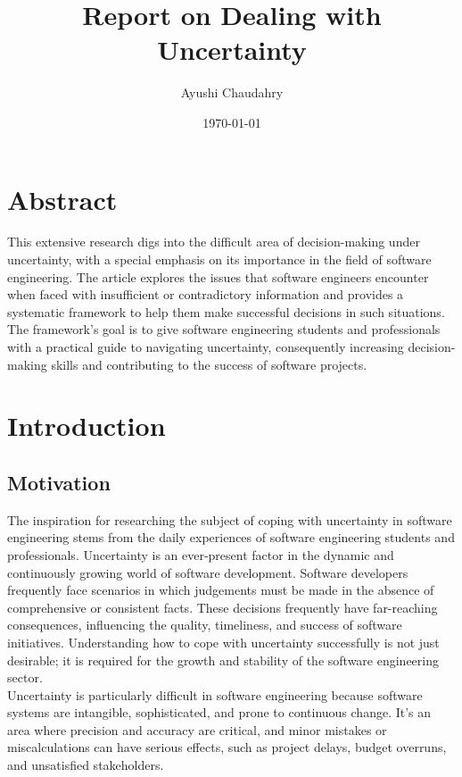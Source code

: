 \documentclass[a4paper,12pt]{report}
\begin{document}
\title{Report on Dealing with Uncertainty}
\author{Ayushi Chaudahry}
\date{\today}

\maketitle

\tableofcontents

\chapter{Abstract}

This extensive research digs into the difficult area of decision-making under uncertainty, with a special emphasis on its importance in the field of software engineering. The article explores the issues that software engineers encounter when faced with insufficient or contradictory information and provides a systematic framework to help them make successful decisions in such situations. The framework's goal is to give software engineering students and professionals with a practical guide to navigating uncertainty, consequently increasing decision-making skills and contributing to the success of software projects.

\chapter{Introduction}
\section{Motivation}

The inspiration for researching the subject of coping with uncertainty in software engineering stems from the daily experiences of software engineering students and professionals. Uncertainty is an ever-present factor in the dynamic and continuously growing world of software development. Software developers frequently face scenarios in which judgements must be made in the absence of comprehensive or consistent facts. These decisions frequently have far-reaching consequences, influencing the quality, timeliness, and success of software initiatives. Understanding how to cope with uncertainty successfully is not just desirable; it is required for the growth and stability of the software engineering sector.
\\
Uncertainty is particularly difficult in software engineering because software systems are intangible, sophisticated, and prone to continuous change. It's an area where precision and accuracy are critical, and minor mistakes or miscalculations can have serious effects, such as project delays, budget overruns, and unsatisfied stakeholders.
\end{document}
